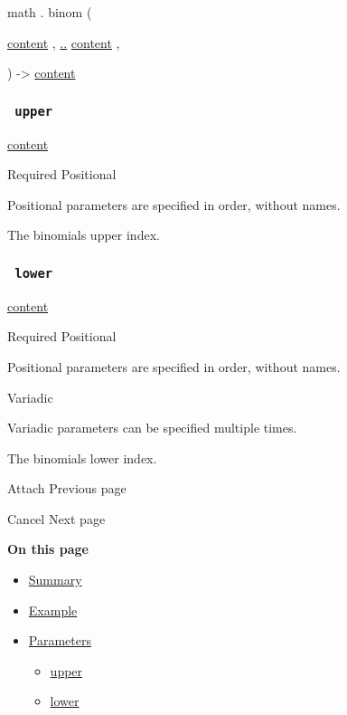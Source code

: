 math { . } { binom } (

{ \href{/docs/reference/foundations/content/}{content} , } {
\hyperref[parameters-lower]{..}
\href{/docs/reference/foundations/content/}{content} , }

) -\textgreater{} \href{/docs/reference/foundations/content/}{content}

\subsubsection{\texorpdfstring{\texttt{\ upper\ }}{ upper }}\label{parameters-upper}

\href{/docs/reference/foundations/content/}{content}

{Required} {{ Positional }}

\label{parameters-upper-positional-tooltip}
Positional parameters are specified in order, without names.

The binomial\textquotesingle s upper index.

\subsubsection{\texorpdfstring{\texttt{\ lower\ }}{ lower }}\label{parameters-lower}

\href{/docs/reference/foundations/content/}{content}

{Required} {{ Positional }}

\label{parameters-lower-positional-tooltip}
Positional parameters are specified in order, without names.

{{ Variadic }}

\label{parameters-lower-variadic-tooltip}
Variadic parameters can be specified multiple times.

The binomial\textquotesingle s lower index.

\href{/docs/reference/math/attach/}{\pandocbounded{}}

{ Attach } { Previous page }

\href{/docs/reference/math/cancel/}{\pandocbounded{}}

{ Cancel } { Next page }

\textbf{On this page}

\begin{itemize}
\tightlist
\item
  \hyperref[summary]{Summary}
\item
  \hyperref[example]{Example}
\item
  \hyperref[parameters]{Parameters}

  \begin{itemize}
  \tightlist
  \item
    \hyperref[parameters-upper]{upper}
  \item
    \hyperref[parameters-lower]{lower}
  \end{itemize}
\end{itemize}

